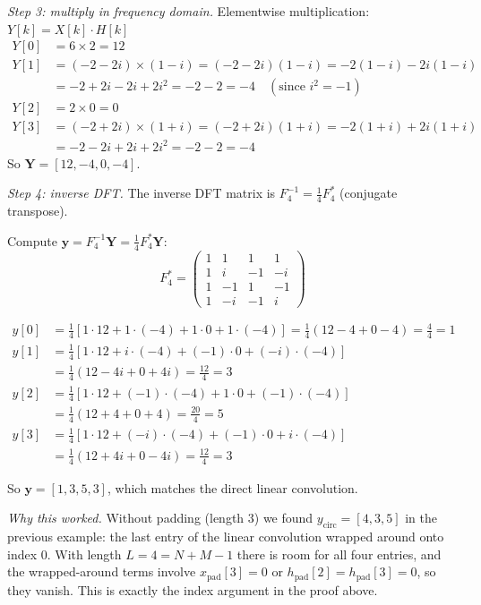 \begin{notechapter}
\begin{example}
\vspace{0.3cm}
\emph{Step 3: multiply in frequency domain.}
Elementwise multiplication: $Y[k] = X[k] \cdot H[k]$
\begin{align*}
Y[0] &= 6 \times 2 = 12 \\
Y[1] &= (-2-2i) \times (1-i) = (-2-2i)(1-i) = -2(1-i) -2i(1-i) \\
     &= -2 + 2i - 2i + 2i^2 = -2 - 2 = -4 \quad (\text{since } i^2 = -1) \\
Y[2] &= 2 \times 0 = 0 \\
Y[3] &= (-2+2i) \times (1+i) = (-2+2i)(1+i) = -2(1+i) + 2i(1+i) \\
     &= -2 - 2i + 2i + 2i^2 = -2 - 2 = -4
\end{align*}
So $\mathbf{Y} = [12, -4, 0, -4]$.

\vspace{0.3cm}
\emph{Step 4: inverse DFT.}
The inverse DFT matrix is $F_4^{-1} = \frac{1}{4} F_4^*$ (conjugate transpose).

Compute $\mathbf{y} = F_4^{-1} \mathbf{Y} = \frac{1}{4} F_4^* \mathbf{Y}$:
\[
F_4^* = \begin{pmatrix}
1 & 1 & 1 & 1 \\
1 & i & -1 & -i \\
1 & -1 & 1 & -1 \\
1 & -i & -1 & i
\end{pmatrix}
\]

\begin{align*}
y[0] &= \frac{1}{4}[1\cdot 12 + 1\cdot(-4) + 1\cdot 0 + 1\cdot(-4)] =
\frac{1}{4}(12 - 4 + 0 - 4) = \frac{4}{4} = 1 \\
y[1] &= \frac{1}{4}[1\cdot 12 + i\cdot(-4) + (-1)\cdot 0 + (-i)\cdot(-4)] \\
     &= \frac{1}{4}(12 - 4i + 0 + 4i) = \frac{12}{4} = 3 \\
y[2] &= \frac{1}{4}[1\cdot 12 + (-1)\cdot(-4) + 1\cdot 0 + (-1)\cdot(-4)] \\
     &= \frac{1}{4}(12 + 4 + 0 + 4) = \frac{20}{4} = 5 \\
y[3] &= \frac{1}{4}[1\cdot 12 + (-i)\cdot(-4) + (-1)\cdot 0 + i\cdot(-4)] \\
     &= \frac{1}{4}(12 + 4i + 0 - 4i) = \frac{12}{4} = 3
\end{align*}

So $\mathbf{y} = [1, 3, 5, 3]$, which matches the direct linear convolution.

\vspace{0.3cm}
\emph{Why this worked.} Without padding (length $3$) we found $y_{\text{circ}} = [4, 3, 5]$ in the previous example: the last entry of the linear convolution wrapped around onto index $0$. With length $L = 4 = N+M-1$ there is room for all four entries, and the wrapped-around terms involve $x_{\text{pad}}[3] = 0$ or $h_{\text{pad}}[2] = h_{\text{pad}}[3] = 0$, so they vanish. This is exactly the index argument in the proof above.


\end{example}
\end{notechapter}
